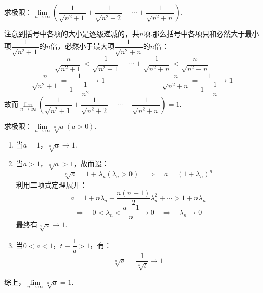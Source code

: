 \begin{question}
    求极限：$\lim\limits_{n \to \infty}\left(\dfrac{1}{\sqrt{n^2+1}} + \dfrac{1}{\sqrt{n^2+2}} + \cdots + \dfrac{1}{\sqrt{n^2+n}}\right)$.
\end{question}
\begin{solution}
    注意到括号中各项的大小是逐级递减的，共$n$项.那么括号中各项只和必然大于最小项$\dfrac{1}{\sqrt{n^2+1}}$的$n$倍，必然小于最大项$\dfrac{1}{\sqrt{n^2+n}}$的$n$倍：
    \[\frac{n}{\sqrt{n^2+1}} < \frac{1}{\sqrt{n^2+1}} + \cdots + \frac{1}{\sqrt{n^2+n}} < \frac{n}{\sqrt{n^2+n}}\]
    \[\dfrac{n}{\sqrt{n^2+1}} = \dfrac{1}{1+\dfrac{1}{n^2}} \to 1 \qquad\qquad\qquad\qquad
        \dfrac{n}{\sqrt{n^2+n}} = \dfrac{1}{1+\dfrac{1}{n}} \to 1 \]
    故而$\lim\limits_{n \to \infty}\left(\dfrac{1}{\sqrt{n^2+1}} + \dfrac{1}{\sqrt{n^2+2}} + \cdots + \dfrac{1}{\sqrt{n^2+n}}\right) = 1$.
\end{solution}

\begin{question}
    求极限：$\lim\limits_{n \to \infty}\sqrt[n]{a}(a>0)$.
\end{question}
\begin{solution}
    \begin{enumerate}[circ]
        \item 当$a=1$，$\sqrt[n]{a} \to 1$.
        \item 当$a>1$，$\sqrt[n]{a} > 1$，故而设：
        \[\sqrt[n]{a} = 1 + \lambda_n(\lambda_n>0) \quad\Rightarrow\quad a=(1+\lambda_n)^n\]
        利用二项式定理展开：
        \[a = 1 + n \lambda_n + \frac{n(n-1)}{2}\lambda_n^2+\cdots > 1 + n \lambda_n\]
        \[\Rightarrow\quad 0 < \lambda_n < \frac{a-1}{n} \to 0 \quad\Rightarrow\quad \lambda_n \to 0\]
        最终有$\sqrt[n]{a} \to 1$.
        \item 当$0<a<1$，$t \equiv \dfrac{1}{a}>1$，有：
        \[\sqrt[n]{a} = \frac{1}{\sqrt[n]{t}} \to 1\]
    \end{enumerate}
    综上，$\lim\limits_{n \to \infty}\sqrt[n]{a} = 1$.
\end{solution}

